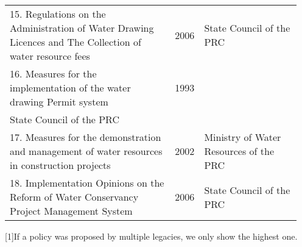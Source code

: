 \begin{table*}[!h]
\begin{minipage}{\linewidth}
{\begin{tabular}{p{0.6\linewidth}rp{0.35\linewidth}}
        15. Regulations on the Administration of Water Drawing Licences and The Collection of water resource fees & 2006 & State Council of the PRC \\
        16. Measures for the implementation of the water drawing Permit system & 1993 \\ State Council of the PRC \\
        17. Measures for the demonstration and management of water resources in construction projects & 2002 & Ministry of Water Resources of the PRC \\
        18. Implementation Opinions on the Reform of Water Conservancy Project Management System & 2006 & State Council of the PRC \\
        \bottomrule
    \end{tabular}}

    \footnotesize[1]{If a policy was proposed by multiple legacies, we only show the highest one.}
    \end{minipage}
\end{table*}
